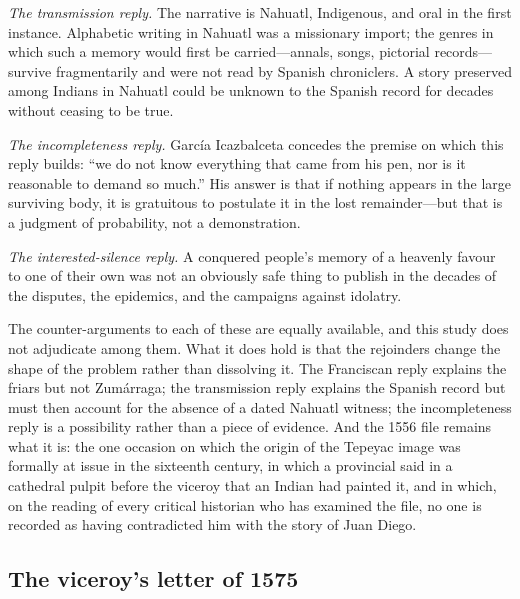 \emph{The transmission reply.} The narrative is Nahuatl, Indigenous,
and oral in the first instance. Alphabetic writing in Nahuatl was a
missionary import; the genres in which such a memory would first be
carried---annals, songs, pictorial records---survive fragmentarily
and were not read by Spanish chroniclers. A story preserved among
Indians in Nahuatl could be unknown to the Spanish record for
decades without ceasing to be true.

\emph{The incompleteness reply.} Garc\'ia Icazbalceta concedes the
premise on which this reply builds: ``we do not know everything that
came from his pen, nor is it reasonable to demand so much.'' His
answer is that if nothing appears in the large surviving body, it is
gratuitous to postulate it in the lost remainder---but that is a
judgment of probability, not a demonstration.

\emph{The interested-silence reply.} A conquered people's memory of a
heavenly favour to one of their own was not an obviously safe thing
to publish in the decades of the  disputes, the
epidemics, and the campaigns against idolatry.

The counter-arguments to each of these are equally available, and
this study does not adjudicate among them. What it does hold is that
the rejoinders change the shape of the problem rather than dissolving
it. The Franciscan reply explains the friars but not Zum\'arraga; the
transmission reply explains the Spanish record but must then account
for the absence of a dated Nahuatl witness; the incompleteness reply
is a possibility rather than a piece of evidence. And the 1556 file
remains what it is: the one occasion on which the origin of the
Tepeyac image was formally at issue in the sixteenth century, in
which a provincial said in a cathedral pulpit before the viceroy that
an Indian had painted it, and in which, on the reading of every
critical historian who has examined the file, no one is recorded as
having contradicted him with the story of Juan Diego.

\subsection{The viceroy's letter of 1575}

